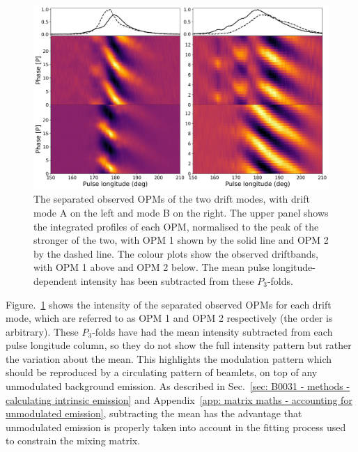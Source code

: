 \begin{figure}
    \begin{center}
        \includegraphics[width=\textwidth]{Figures/B0031/observed_OPMs}
        \caption[PSR~B0031$-$07's two drift modes split into two OPMs]{The separated observed OPMs of the two drift modes, with drift mode A on the left and mode B on the right. The upper panel shows the integrated profiles of each OPM, normalised to the peak of the stronger of the two, with OPM 1 shown by the solid line and OPM 2 by the dashed line. The colour plots show the observed driftbands, with OPM 1 above and OPM 2 below. The mean pulse longitude-dependent intensity has been subtracted from these $P_3$-folds.}
        \label{fig: B0031 - observed OPMs}
    \end{center}
\end{figure}

Figure.~\ref{fig: B0031 - observed OPMs} shows the intensity of the separated observed OPMs for each drift mode, which are referred to as OPM 1 and OPM 2 respectively (the order is arbitrary). These $P_3$-folds have had the mean intensity subtracted from each pulse longitude column, so they do not show the full intensity pattern but rather the variation about the mean. This highlights the modulation pattern which should be reproduced by a circulating pattern of beamlets, on top of any unmodulated background emission. As described in Sec.~\ref{sec: B0031 - methods - calculating intrinsic emission} and Appendix~\ref{app: matrix maths - accounting for unmodulated emission}, subtracting the mean has the advantage that unmodulated emission is properly taken into account in the fitting process used to constrain the mixing matrix. 

